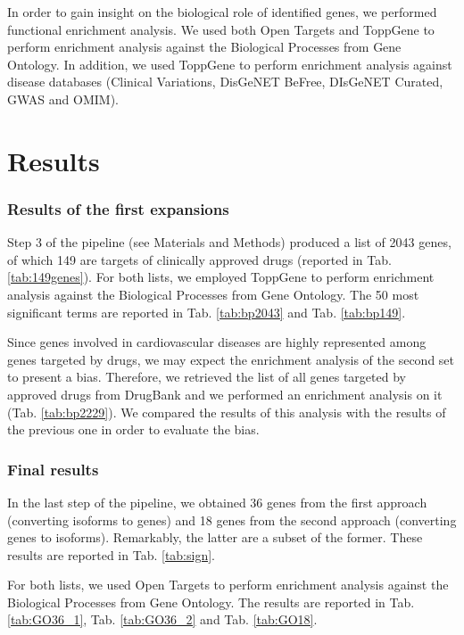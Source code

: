 \documentclass[fleqn,10pt]{SelfArx} %
\begin{document}
In order to gain insight on the biological role of identified genes, we performed functional enrichment analysis. We used both Open Targets and ToppGene to perform enrichment analysis against the Biological Processes from Gene Ontology. In addition, we used ToppGene to perform enrichment analysis against disease databases (Clinical Variations, DisGeNET BeFree, DIsGeNET Curated, GWAS and OMIM).

\section*{Results}

\subsubsection*{Results of the first expansions}
Step 3 of the pipeline (see Materials and Methods) produced a list of 2043 genes, of which 149 are targets of clinically approved drugs (reported in Tab. \ref{tab:149genes}). For both lists, we employed ToppGene to perform enrichment analysis against the Biological Processes from Gene Ontology. The 50 most significant terms are reported in Tab. \ref{tab:bp2043} and Tab. \ref{tab:bp149}.

Since genes involved in cardiovascular diseases are highly represented among genes targeted by drugs, we may expect the enrichment analysis of the second set to present a bias. Therefore, we retrieved the list of all genes targeted by approved drugs from DrugBank and we performed an enrichment analysis on it (Tab. \ref{tab:bp2229}). We compared the results of this analysis with the results of the previous one in order to evaluate the bias.

\subsubsection*{Final results}
In the last step of the pipeline, we obtained 36 genes from the first approach (converting isoforms to genes) and 18 genes from the second approach (converting genes to isoforms). Remarkably, the latter are a subset of the former. These results are reported in Tab. \ref*{tab:sign}.

For both lists, we used Open Targets to perform enrichment analysis against the Biological Processes from Gene Ontology. The results are reported in Tab. \ref{tab:GO36_1}, Tab. \ref{tab:GO36_2} and Tab. \ref*{tab:GO18}.
\end{document}
